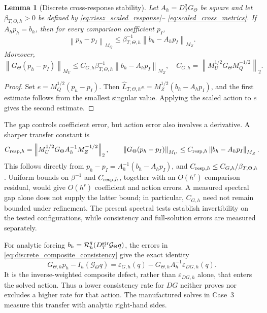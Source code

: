 \documentclass[11pt]{article}
\theoremstyle{plain}
\newtheorem{lemma}[theorem]{Lemma}
\theoremstyle{definition}
\theoremstyle{remark}
\newcommand{\Th}{\Theta}
\newcommand{\norm}[2][]{\left\lVert #2\right\rVert_{#1}}
\begin{document}
\begin{lemma}[Discrete cross-response stability]
\label{prop:discrete_cross_response_stability}
Let $A_h=D_T^qG_\Th$ be square and let
$\beta_{T,\Th,h}>0$ be defined by \eqref{eq:riesz_scaled_response}--
\eqref{eq:scaled_cross_metrics}.  If $A_hp_h=b_h$, then for every comparison
coefficient $p_I$,
\begin{equation}
 \norm[M_Q]{p_h-p_I}
 \le \beta_{T,\Th,h}^{-1}
      \norm[M_Z]{b_h-A_hp_I}.
 \label{eq:discrete_pressure_stability_bound}
\end{equation}
Moreover,
\begin{equation}
 \norm[M_U]{G_\Th(p_h-p_I)}
 \le C_{G,h}\beta_{T,\Th,h}^{-1}
      \norm[M_Z]{b_h-A_hp_I},
 \quad
 C_{G,h}=\norm[2]{M_U^{1/2}G_\Th M_Q^{-1/2}}.
 \label{eq:discrete_action_stability_bound}
\end{equation}
\end{lemma}

\begin{proof}
Set $e=M_Q^{1/2}(p_h-p_I)$.  Then
$\widehat L_{T,\Th,h}e=M_Z^{1/2}(b_h-A_hp_I)$, and the first estimate follows
from the smallest singular value.  Applying the scaled action to $e$ gives the
second estimate.
\end{proof}

The gap controls coefficient error, but action error also involves a
derivative.  A sharper transfer constant is
\begin{equation}
 C_{{\rm resp},h}
 =\norm[2]{M_U^{1/2}G_\Th A_h^{-1}M_Z^{-1/2}},\qquad
 \norm[M_U]{G_\Th(p_h-p_I)}
 \le C_{{\rm resp},h}\norm[M_Z]{b_h-A_hp_I}.
 \label{eq:discrete_response_transfer}
\end{equation}
This follows directly from $p_h-p_I=A_h^{-1}(b_h-A_hp_I)$, and
$C_{{\rm resp},h}\le C_{G,h}/\beta_{T,\Th,h}$.  Uniform bounds on
$\beta^{-1}$ and $C_{{\rm resp},h}$, together with an $O(h^r)$ comparison
residual, would give $O(h^r)$ coefficient and action errors.  A measured
spectral gap alone does not supply the latter bound; in particular,
$C_{G,h}$ need not remain bounded under refinement.  The present spectral
tests establish invertibility on the tested configurations, while consistency
and full-solution errors are measured separately.

For analytic forcing $b_h=\mathcal R_h^q(D_T^{\rm str}\mathcal G_\Th q)$,
the errors in \eqref{eq:discrete_composite_consistency} give the exact identity
\begin{equation}
 G_{\Th,h}p_h-I_h(\mathcal G_\Th q)
 =\varepsilon_{G,h}(q)
  -G_{\Th,h}A_h^{-1}\varepsilon_{DG,h}(q).
 \label{eq:solved_action_error_decomposition}
\end{equation}
It is the inverse-weighted composite defect, rather than
$\varepsilon_{DG,h}$ alone, that enters the solved action.  Thus a lower
consistency rate for $DG$ neither proves nor excludes a higher rate for that
action.  The manufactured solves in Case~3 measure this transfer with analytic
right-hand sides.
\end{document}
